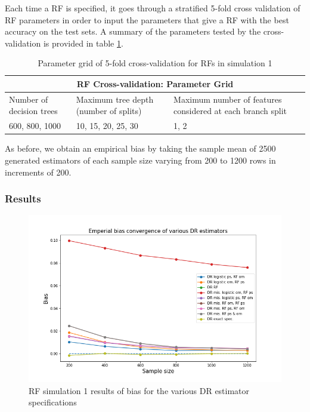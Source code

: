 \documentclass[12pt,twoside]{article}
\begin{document}
Each time a RF is specified, it goes through a stratified 5-fold cross validation of RF parameters in order to input the parameters that give a RF with the best accuracy on the test sets. A summary of the parameters tested by the cross-validation is provided in table \ref{tableRF}.\\
\begin{table}[]
    \centering
\begin{tabular}{ |p{3cm}|p{3cm}|p{3cm}| }
 \hline
 \multicolumn{3}{|c|}{RF Cross-validation: Parameter Grid} \\
 \hline
 Number of decision trees & Maximum tree depth (number of splits)  & Maximum    number of features considered at each branch split\\
 \hline
 600, 800, 1000& 10, 15, 20, 25, 30 & 1, 2 \\
 \hline 
\end{tabular}
\caption{Parameter grid of 5-fold cross-validation for RFs in simulation 1}
\label{tableRF}
\end{table}

As before, we obtain an empirical bias by taking the sample mean of 2500 generated estimators of each sample size varying from 200 to 1200 rows in increments of 200. 

\subsubsection*{Results}

\begin{figure}[h!]
    \centering
    \includegraphics[width = 0.9\columnwidth]{figures/biasRF.png}
    \caption{RF simulation 1 results of bias for the various DR estimator specifications}
    \label{figbiasRF}
\end{figure}
\end{document}
